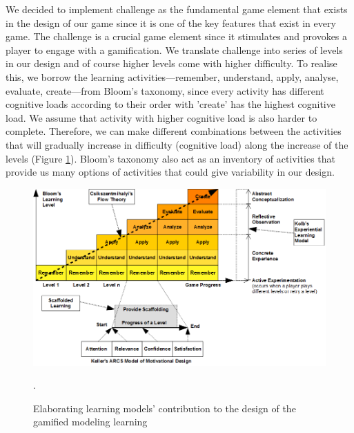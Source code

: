 \documentclass[12pt, a4paper]{report}
\begin{document}
{We decided to implement challenge as the fundamental game element that exists in the design of our game since it is one of the key features that exist in every game. The challenge is a crucial game element since it stimulates and provokes a player to engage with a gamification. We translate challenge into series of levels in our design and of course higher levels come with higher difficulty. To realise this, we borrow the learning activities---remember, understand, apply, analyse, evaluate, create---from Bloom's taxonomy, since every activity has different cognitive loads according to their order with 'create' has the highest cognitive load. We assume that activity with higher cognitive load is also harder to complete. Therefore, we can make different combinations between the activities that will gradually increase in difficulty (cognitive load) along the increase of the levels (Figure \ref{learning-models}). Bloom's taxonomy also act as an inventory of activities that provide us many options of activities that could give variability in our design. 

\begin{figure}[ht]
\centering
\includegraphics[width=\textwidth]{learning-models}
\caption{Elaborating learning models' contribution to the design of the gamified modeling learning}.
\label{learning-models}
\end{figure}

}
\end{document}
